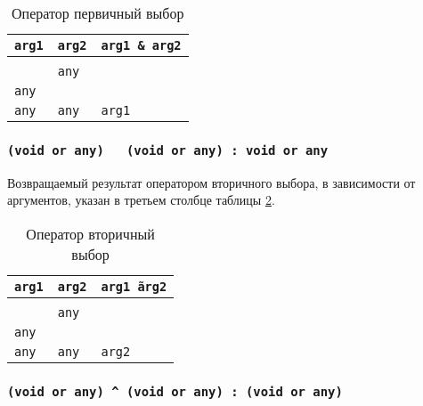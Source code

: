 \begin{table}[htb]
	\caption{Оператор первичный выбор}
	\label{andhacktable}
	\begin{tabular}{|l|l|l|}
		\hline
		\texttt{arg1} & \texttt{arg2} & \texttt{arg1 \& arg2} \\ \hline
		\void{}     & \void{}     & \void{}   			\\ \hline
		\void{}     & \texttt{any}  & \void{}   			\\ \hline
		\texttt{any}  & \void{}     & \void{}   			\\ \hline
		\texttt{any}  & \texttt{any}  & \texttt{arg1}   		\\ \hline
	\end{tabular}
	\vspace{0em}
\end{table}

\subsubsection{\texttt{(void or any) ~ (void or any) : void or any}}

Возвращаемый результат оператором вторичного выбора, в зависимости от аргументов, указан в третьем столбце таблицы \ref{eqhacktable}.

\begin{table}[htb]
	\caption{Оператор вторичный выбор}
	\label{eqhacktable}
	\begin{tabular}{|l|l|l|}
		\hline
		\texttt{arg1} & \texttt{arg2} & \texttt{arg1 \~ arg2} \\ \hline
		\void{}     & \void{}     & \void{}   			\\ \hline
		\void{}     & \texttt{any}  & \void{}   			\\ \hline
		\texttt{any}  & \void{}     & \void{}   			\\ \hline
		\texttt{any}  & \texttt{any}  & \texttt{arg2}   		\\ \hline
	\end{tabular}
	\vspace{-2em}
\end{table}

\subsubsection{\texttt{(void or any) ^ (void or any) : (void or any)}}

